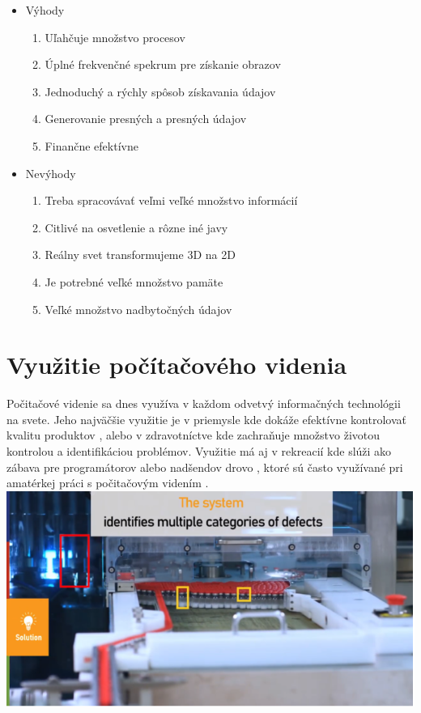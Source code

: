 \documentclass[10pt,twoside,slovak,a4paper]{article}
\begin{document}
\begin{itemize}
\item Výhody
	\begin{enumerate}
	\item Uľahčuje množstvo procesov
	\item Úplné frekvenčné spekrum pre získanie obrazov
	\item Jednoduchý a rýchly spôsob získavania údajov
	\item Generovanie presných a presných údajov
	\item Finančne efektívne
	\end{enumerate}
\end{itemize}

\begin{itemize}
\item Nevýhody
	\begin{enumerate}
	\item Treba spracovávať veľmi veľké množstvo informácií
	\item Citlivé na osvetlenie a rôzne iné javy
	\item Reálny svet transformujeme 3D na 2D
	\item Je potrebné veľké množstvo pamäte
	\item Veľké množstvo nadbytočných údajov 
	\cite{CV-inspection-system}
	\end{enumerate}
\end{itemize}

\section{Využitie počítačového videnia}
Počitačové videnie sa dnes využíva v každom odvetvý informačných technológii na svete. Jeho najväčšie využitie je v priemysle kde dokáže efektívne kontrolovať kvalitu produktov , alebo v zdravotníctve kde zachraňuje množstvo životou kontrolou a identifikáciou problémov. Využitie má aj v rekreacií kde slúži ako zábava pre programátorov alebo nadšendov drovo , ktoré sú často využívané pri amatérkej práci s počitačovým videním . \cite{CV-inspection-system} 
\includegraphics[scale=0.85]{defect_detection.png}
\cite{inspection-in-manufacturing}
\end{document}
